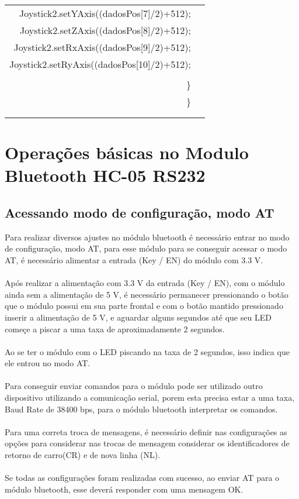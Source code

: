 \begin{longtable}{Rp{15cm}}
\qquad \qquad    Joystick2.setYAxis((dadosPos[7]/2)+512);  \\
\qquad \qquad    Joystick2.setZAxis((dadosPos[8]/2)+512);  \\
\qquad \qquad    Joystick2.setRxAxis((dadosPos[9]/2)+512);  \\
\qquad \qquad    Joystick2.setRyAxis((dadosPos[10]/2)+512); \\
    \\
\qquad    \} \\
\} \\
\\
\\


 \hline
 \end{longtable}

\newpage
\begin{table}[H]
	\chapter{Operações básicas no Modulo Bluetooth HC-05 RS232}
    \label{app:apendHC05}
    \section{Acessando modo de configuração, modo AT}
    Para realizar diversos ajustes no módulo bluetooth é necessário entrar no modo de configuração, modo AT, para esse módulo para se conseguir acessar o modo AT, é necessário alimentar a entrada (Key / EN) do módulo com 3.3 V. 
   \\
   \\
   Após realizar a alimentação com 3.3 V da entrada (Key / EN), com o módulo ainda sem a alimentação de 5 V, é necessário permanecer pressionando o botão que o módulo possui em sua parte frontal e com o botão mantido pressionado inserir a alimentação de 5 V, e aguardar alguns segundos até que seu LED começe a piscar a uma taxa de aproximadamente 2 segundos.
   \\
   \\
   Ao se ter o módulo com o LED piscando na taxa de 2 segundos, isso indica que ele entrou no modo AT.
   \\
   \\
   Para conseguir enviar comandos para o módulo pode ser utilizado outro dispositivo utilizando a comunicação serial, porem esta precisa estar a uma taxa, Baud Rate de 38400 bps, para o módulo bluetooth interpretar os comandos.
   \\
   \\
   Para uma correta troca de mensagens, é necessário definir nas configurações as opções para considerar nas trocas de mensagem considerar os identificadores de retorno de carro(CR) e de nova linha (NL).
   \\
   \\
   Se todas as configurações foram realizadas com sucesso, ao enviar AT para o módulo bluetooth, esse deverá responder com uma mensagem OK.
   

\end{table}
